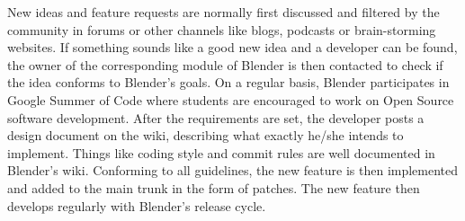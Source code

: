 New ideas and feature requests are normally first discussed and filtered by the community in forums or other channels like blogs, podcasts or brain-storming websites.\cite{blender-community} 
If something sounds like a good new idea and a developer can be found, the owner of the corresponding module of Blender is then contacted to check if the idea conforms to Blender's goals. 
On a regular basis, Blender participates in Google Summer of Code where students are encouraged to work on Open Source software development.\cite{blender-gsoc-2016}
After the requirements are set, the developer posts a design document on the wiki, describing what exactly he/she intends to implement.\cite{blender-new-devs}
Things like coding style\cite{blender-style-rules} and commit rules\cite{blender-new-devs} are well documented in Blender's wiki. 
Conforming to all guidelines, the new feature is then implemented and added to the main trunk in the form of patches. 
The new feature then develops regularly with Blender's release cycle.

